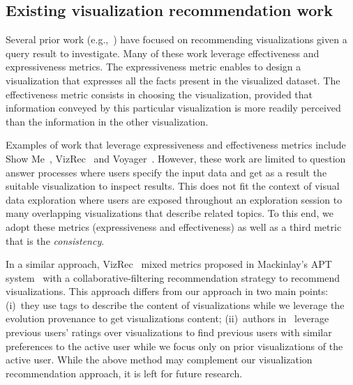 \subsection{Existing visualization recommendation work}   
Several prior work (e.g.,~\cite{Wongsuphasawat2016,Mutlu:2016,Mackinlay:2007,polaris2002,Wongsuphasawat:2017}) have focused on recommending visualizations given a query result to investigate.
Many of these work leverage effectiveness and expressiveness metrics.
The expressiveness metric enables to design a visualization that expresses all the facts present in the visualized dataset.
The effectiveness metric consists in choosing the visualization, provided that information conveyed by this particular visualization is more readily perceived than the information in the other visualization.


Examples of work that leverage expressiveness and effectiveness metrics include Show Me~\cite{Mackinlay:2007}, VizRec~\cite{Mutlu:2016} and Voyager~\cite{Wongsuphasawat2016}.
However, these work are limited to question answer processes where users specify the input data and get as a result the suitable visualization to inspect results.
This does not fit the context of visual data exploration where users are exposed throughout an exploration session to many overlapping visualizations that describe related topics. 
To this end, we adopt these metrics (expressiveness and effectiveness) as well as a third metric that is the \emph{consistency}.


In a similar approach, VizRec~\cite{Mutlu:2016} mixed metrics proposed in Mackinlay's APT system~\cite{Mackinlay86} with a collaborative-filtering recommendation strategy to recommend visualizations. 
This approach differs from our approach in two main points: (i)~they use tags to describe the content of visualizations while we leverage the evolution provenance to get visualizations content; (ii)~authors in~\cite{Mutlu:2016} leverage previous users' ratings over visualizations to find previous users with similar preferences to the active user while we focus only on prior visualizations of the active user. 
While the above method may complement our visualization recommendation approach, it is left for future research.



